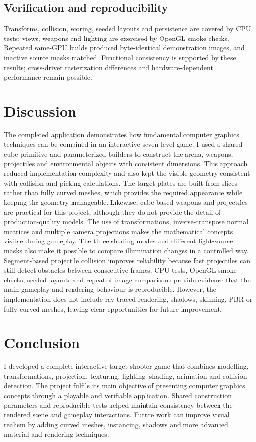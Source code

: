 \subsection{Verification and reproducibility}
Transforms, collision, scoring, seeded layouts and persistence are covered by CPU tests; views, weapons and lighting are exercised by OpenGL smoke checks. Repeated same-GPU builds produced byte-identical demonstration images, and inactive source masks matched. Functional consistency is supported by these results; cross-driver rasterization differences and hardware-dependent performance remain possible.
\section{Discussion}
The completed application demonstrates how fundamental computer graphics techniques can be combined in an interactive seven-level game. I used a shared cube primitive and parameterized builders to construct the arena, weapons, projectiles and environmental objects with consistent dimensions. This approach reduced implementation complexity and also kept the visible geometry consistent with collision and picking calculations. The target plates are built from slices rather than fully curved meshes, which provides the required appearance while keeping the geometry manageable. Likewise, cube-based weapons and projectiles are practical for this project, although they do not provide the detail of production-quality models. The use of transformations, inverse-transpose normal matrices and multiple camera projections makes the mathematical concepts visible during gameplay. The three shading modes and different light-source masks also make it possible to compare illumination changes in a controlled way. Segment-based projectile collision improves reliability because fast projectiles can still detect obstacles between consecutive frames. CPU tests, OpenGL smoke checks, seeded layouts and repeated image comparisons provide evidence that the main gameplay and rendering behaviour is reproducible. However, the implementation does not include ray-traced rendering, shadows, skinning, PBR or fully curved meshes, leaving clear opportunities for future improvement.

\section{Conclusion}
I developed a complete interactive target-shooter game that combines modelling, transformations, projection, texturing, lighting, shading, animation and collision detection. The project fulfils its main objective of presenting computer graphics concepts through a playable and verifiable application. Shared construction parameters and reproducible tests helped maintain consistency between the rendered scene and gameplay interactions. Future work can improve visual realism by adding curved meshes, instancing, shadows and more advanced material and rendering techniques.



